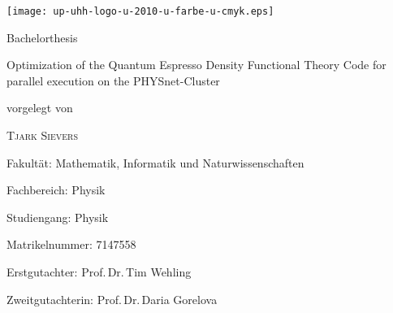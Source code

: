 \documentclass[main.tex]{subfiles}
\begin{document}
\begin{titlepage}
    \texttt{[image: up-uhh-logo-u-2010-u-farbe-u-cmyk.eps]}\par
    \vspace{4\baselineskip}

    \begin{center}
        {\Large\textcolor{UHHred}{Bachelorthesis}\par}

        {\Huge Optimization of the Quantum Espresso Density Functional Theory Code for parallel execution on the PHYSnet-Cluster\par}

        \vspace{4\baselineskip}

        vorgelegt von\par

        {\Large\textsc{Tjark Sievers}\par}
    \end{center}

    \vfill

    Fakultät: Mathematik, Informatik und Naturwissenschaften\par
    Fachbereich: Physik\par
    Studiengang: Physik\par
    Matrikelnummer: 7147558\par
 
    Erstgutachter: Prof.\,Dr.\,Tim Wehling \par
    Zweitgutachterin: Prof.\,Dr.\,Daria Gorelova \par
\end{titlepage}
\end{document}
